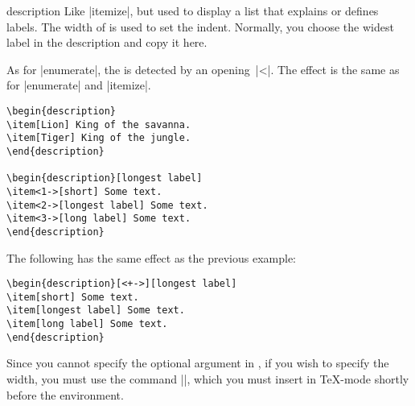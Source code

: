   
\begin{environment}{{description}} 
  Like |itemize|, but used to display a list that explains or defines
  labels. The width of  is used to set the indent. Normally,
  you choose the widest label in the description and copy it here.

  As for |enumerate|, the  is
  detected by an opening~|<|. The effect is the same as for
  |enumerate| and |itemize|.
  \example
\begin{verbatim}
\begin{description}
\item[Lion] King of the savanna.
\item[Tiger] King of the jungle.
\end{description}

\begin{description}[longest label]
\item<1->[short] Some text.
\item<2->[longest label] Some text.
\item<3->[long label] Some text.
\end{description}
\end{verbatim}

  \example The following has the same effect as the previous example:
\begin{verbatim}
\begin{description}[<+->][longest label]
\item[short] Some text.
\item[longest label] Some text.
\item[long label] Some text.
\end{description}
\end{verbatim}

  \lyxnote
  Since you cannot specify the optional argument in \LyX, if you wish
  to specify the width, you must use the command
  |\usedescriptionitemofwidthas|, which you must insert in \TeX-mode
  shortly before the environment.
\end{environment}


